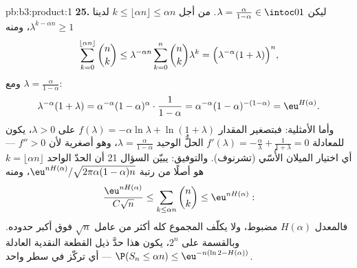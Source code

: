 \begin{solution}{pb:b3:product:1}
\textbf{25.} ليكن $\lambda = \frac{\alpha}{1-\alpha} \in
\intoc01$. من أجل $k \leq \lfloor\alpha n\rfloor \leq \alpha n$
لدينا $\lambda^{k - \alpha n} \geq 1$، ومنه
\[
\sum_{k=0}^{\lfloor\alpha n\rfloor}\binom nk
\leq \lambda^{-\alpha n}\sum_{k=0}^{n}\binom nk\lambda^{k}
= \Bigl(\lambda^{-\alpha}(1 + \lambda)\Bigr)^{n},
\]
ومع $\lambda = \frac\alpha{1-\alpha}$:
\[
\lambda^{-\alpha}(1+\lambda)
= \alpha^{-\alpha}(1-\alpha)^{\alpha}\cdot\frac1{1-\alpha}
= \alpha^{-\alpha}(1-\alpha)^{-(1-\alpha)}
= \eu^{H(\alpha)} .
\]
وأما الأمثلية: فبتصغير المقدار $f(\lambda) = -\alpha\ln\lambda +
\ln(1+\lambda)$ على $\lambda > 0$، يكون
للمعادلة $f'(\lambda)
= -\frac\alpha\lambda + \frac1{1+\lambda} = 0$ الحلُّ الوحيد
$\lambda = \frac\alpha{1-\alpha}$، وهو أصغرية لأن
$f'' > 0$ --- أي اختيار الميلان الأُسّي (تشرنوف).
والتوفيق: يبيّن السؤال 21 أن الحدّ الواحد $k =
\lfloor\alpha n\rfloor$ هو أصلًا من
رتبة
$\eu^{nH(\alpha)}/\sqrt{2\pi\alpha(1-\alpha)n}$، ومنه
\[
\frac{\eu^{nH(\alpha)}}{C\sqrt n} \leq
\sum_{k\leq\alpha n}\binom nk \leq \eu^{nH(\alpha)} :
\]
فالمعدل $H(\alpha)$ مضبوط، ولا يكلّف المجموع كله أكثر من عامل
$\sqrt n$ فوق أكبر حدوده. وبالقسمة على $2^n$، يكون هذا حدَّ
ذيل القطعة النقدية العادلة $\P(S_n \leq \alpha n) \leq
\eu^{-n(\ln2 - H(\alpha))}$ --- أي تركّز  في سطر
واحد.
\end{solution}
